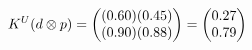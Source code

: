 \documentclass[preview]{standalone}
\begin{document}
\begin{align*}
\special{dvisvgm:raw <g id='unique000'>}K^U(d \otimes p) = \begin{pmatrix} (0.60)(0.45) \\ (0.90)(0.88) \end{pmatrix} = \begin{pmatrix} 0.27 \\ 0.79 \end{pmatrix}\special{dvisvgm:raw </g>}
\end{align*}
\end{document}
